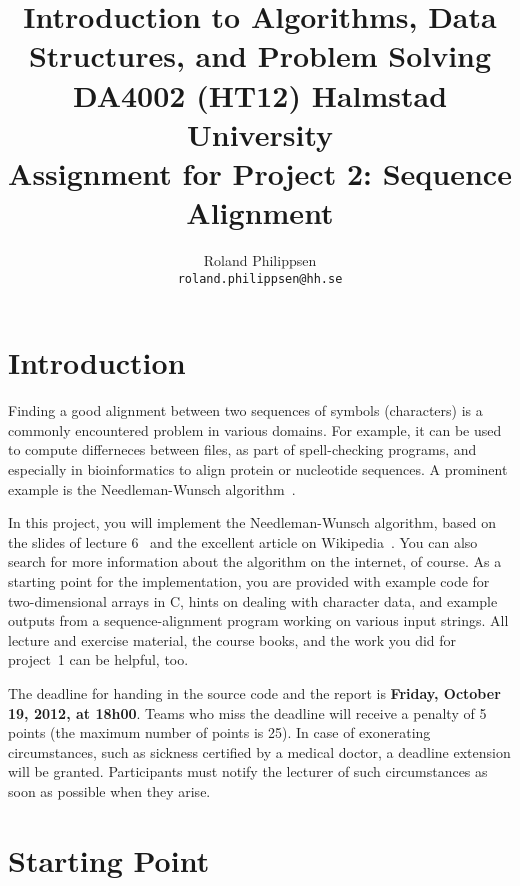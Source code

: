\documentclass[a4paper,10pt]{article}
\begin{document}
\title{
  {\normalsize
    Introduction to Algorithms, Data Structures, and Problem Solving\\
    DA4002 (HT12) Halmstad University}\\
  Assignment for Project 2: Sequence Alignment\\
}
\author{
  Roland Philippsen\\
  \texttt{roland.philippsen@hh.se}
}
\maketitle



\section{Introduction}

Finding a good alignment between two sequences of symbols (characters) is a commonly encountered problem in various domains.
For example, it can be used to compute differneces between files, as part of spell-checking programs, and especially in bioinformatics to align protein or nucleotide sequences.
A prominent example is the Needleman-Wunsch algorithm~\cite{needleman-wunsch:1970}.

In this project, you will implement the Needleman-Wunsch algorithm, based on the slides of lecture 6~\cite{lecture6} and the excellent article on Wikipedia~\cite{wikipedia:needleman-wunsch}.
You can also search for more information about the algorithm on the internet, of course.
As a starting point for the implementation, you are provided with example code for two-dimensional arrays in C, hints on dealing with character data, and example outputs from a sequence-alignment program working on various input strings.
All lecture and exercise material, the course books, and the work you did for project~1 can be helpful, too.

The deadline for handing in the source code and the report is \textbf{Friday, October 19, 2012, at 18h00}.
Teams who miss the deadline will receive a penalty of 5 points (the maximum number of points is 25).
In case of exonerating circumstances, such as sickness certified by a medical doctor, a deadline extension will be granted.
Participants must notify the lecturer of such circumstances as soon as possible when they arise.



\section{Starting Point}
\end{document}
